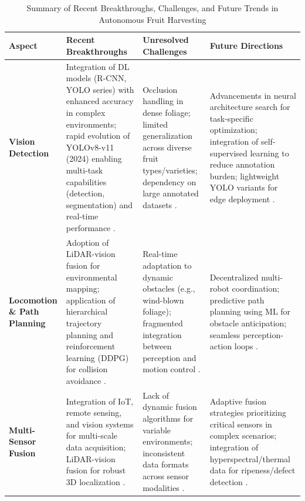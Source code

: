 \documentclass[a4paper,fleqn]{cas-dc}
\begin{document}
\begin{table}[htbp]
  \centering
  \caption{Summary of Recent Breakthroughs, Challenges, and Future Trends in Autonomous Fruit Harvesting}
  \begin{tabular}{p{}p{}p{}p{}}
    \toprule
    \textbf{Aspect} & \textbf{Recent Breakthroughs} & \textbf{Unresolved Challenges} & \textbf{Future Directions} \\
    \midrule
    \textbf{Vision Detection} & Integration of DL models (R-CNN, YOLO series) with enhanced accuracy in complex environments; rapid evolution of YOLOv8-v11 (2024) enabling multi-task capabilities (detection, segmentation) and real-time performance \cite{hou2023overview, suresh2023selective, li2023mta}. & Occlusion handling in dense foliage; limited generalization across diverse fruit types/varieties; dependency on large annotated datasets \cite{hou2023overview, zhang2024automatic}. & Advancements in neural architecture search for task-specific optimization; integration of self-supervised learning to reduce annotation burden; lightweight YOLO variants for edge deployment \cite{suresh2023selective, zhang2024automatic}. \\
    \midrule
    \textbf{Locomotion \& Path Planning} & Adoption of LiDAR-vision fusion for environmental mapping; application of hierarchical trajectory planning and reinforcement learning (DDPG) for collision avoidance \cite{gai2022fruit, liu2024hierarchical, rajendran2024towards}. & Real-time adaptation to dynamic obstacles (e.g., wind-blown foliage); fragmented integration between perception and motion control \cite{rajendran2024towards, li2023multi}. & Decentralized multi-robot coordination; predictive path planning using ML for obstacle anticipation; seamless perception-action loops \cite{lytridis2021overview, liu2024hierarchical}. \\
    \midrule
    \textbf{Multi-Sensor Fusion} & Integration of IoT, remote sensing, and vision systems for multi-scale data acquisition; LiDAR-vision fusion for robust 3D localization \cite{mohamed2021smart, martos2021ensuring, liu2024hierarchical}. & Lack of dynamic fusion algorithms for variable environments; inconsistent data formats across sensor modalities \cite{zhang2024automatic, rajendran2024towards}. & Adaptive fusion strategies prioritizing critical sensors in complex scenarios; integration of hyperspectral/thermal data for ripeness/defect detection \cite{martos2021ensuring, liu2024hierarchical}. \\

\end{tabular}
\end{table}
\end{document}
